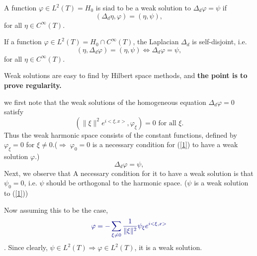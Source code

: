 \documentclass[twoside,openany,12pt]{beautynote}
\begin{document}
\begin{definition}
  A function $\varphi \in L^2 (T) = H_0$ is siad to be a
  weak solution to $\Delta_d
  \varphi = \psi$ if
  \[  (\Delta_d \eta, \varphi) = (\eta, \psi), \]
  for all $\eta \in C^{\infty} (T)$.
\end{definition}

\begin{definition}
  If a function $\varphi \in L^2 (T) = H_0 \cap C^{\infty} (T)$, the
  Laplacian $\Delta_d$ is
  self-disjoint, i.e.
  \[  (\eta, \Delta_d \varphi) = (\eta, \psi) \Longleftrightarrow \Delta_d
     \varphi = \psi, \]
  for all $\eta \in C^{\infty} (T)$.
\end{definition}

{\color[HTML]{B4005A}Weak solutions are easy to find by Hilbert space
  methods, and {\bf the point is to prove regularity.}}


we first note that the weak solutions of the homogeneous equation $\Delta_d
\varphi = 0$ satisfy  $$(\| \xi \|^2 e^{i < \xi, x >}, \varphi_{\xi}) = 0 \text{ for
all $\xi$.}$$  Thus the weak harmonic space consists of the constant functions,
defined by $\varphi_{\xi} = 0$ for $\xi \neq 0$.($\Rightarrow \; \varphi_0 =
0$ is a necessary condition for (\ref{1}) to have a weak solution $\varphi$.)
\begin{equation}
  \Delta_d \varphi = \psi, \label{1}
\end{equation}
Next, we observe that { A necessary condition for it to have a weak solution
is that $\psi_0 = 0$, i.e. $\psi$ should be
orthogonal to the harmonic space}. ($\psi$ is
a weak solution to (\ref{1}))

Now assuming this to be the case,
\[ {\color[HTML]{000080}\varphi = - \sum_{\xi \neq 0} \frac{1}{\| \xi \|^2}
   \psi_{\xi} e^{i < \xi, x >}} \]
{}. Since
clearly, $\psi \in L^2 (T) \Longrightarrow \varphi \in L^2 (T)$, it is a weak
solution. 
\end{document}

